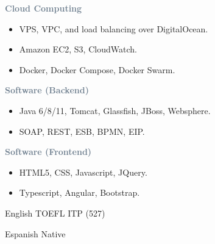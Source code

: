 



\divider


\textcolor{SlateGrey}{\textbf{Cloud Computing}}
\newline

\begin{itemize}
    \item VPS, VPC, and load balancing over DigitalOcean.
    \item Amazon EC2, S3, CloudWatch.
    \item Docker, Docker Compose, Docker Swarm.
\end{itemize}

\textcolor{SlateGrey}{\textbf{Software (Backend)}}
\newline

\begin{itemize}
    \item Java 6/8/11, Tomcat, Glassfish, JBoss, Websphere.
    \item SOAP, REST, ESB, BPMN, EIP.
\end{itemize}

\textcolor{SlateGrey}{\textbf{Software (Frontend)}}
\newline

\begin{itemize}
    \item HTML5, CSS, Javascript, JQuery.
    \item Typescript, Angular, Bootstrap.
\end{itemize}


English \hfill TOEFL ITP (527) 

\divider

Espanish \hfill Native 





